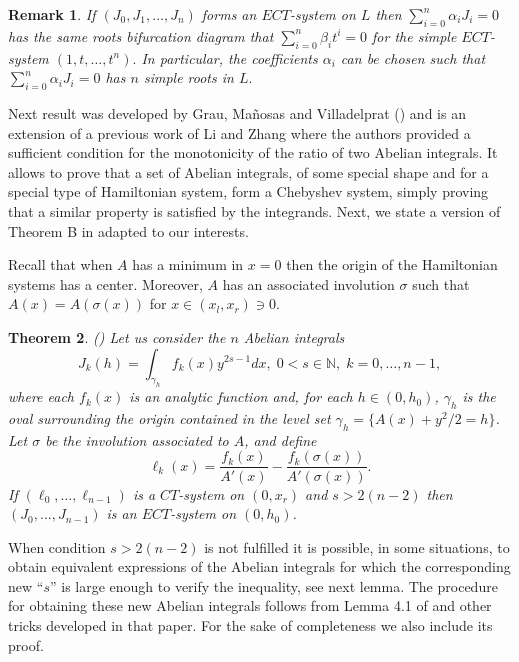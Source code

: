 \documentclass[12pt,a4paper,reqno]{amsart}
\newcommand{\N}{\mathbb{N}}
\newtheorem{teo}{Theorem}[section]
\newtheorem{rem}[teo]{Remark}
\begin{document}
    \begin{rem}%
        If $(J_0, J_1,\ldots, J_n ) $ forms an $ECT$-system on $ L $ then $\sum_ {i = 0} ^ n \alpha_i J_i =0 $
        has the same roots bifurcation diagram that  $\sum_ {i = 0} ^ n \beta_i t ^ i =0$ for the simple  $ECT$-system
        $(1,t,\ldots,t^n).$
         In particular, the  coefficients $\alpha_i$ can be chosen  such that  $\sum_ {i = 0} ^ n \alpha_i J_i =0$ has $n$ simple roots in
         $L.$
    \end{rem}

Next result was developed by Grau, Ma\~{n}osas and Villadelprat
(\cite{GraManVil2011,ManVil2002})  and  is an extension of a
previous work of Li and Zhang \cite{LiZhang1996} where the authors
provided a sufficient condition for the monotonicity of the ratio of
two Abelian integrals. It allows to prove that a set of Abelian
integrals, of some special shape and  for a special type of
Hamiltonian system, form a Chebyshev system, simply proving that a
similar property is satisfied by the integrands. Next, we state a
version of Theorem B in \cite{GraManVil2011} adapted to our
interests.

Recall that when $ A $ has a minimum in $ x = 0 $ then the origin of
the Hamiltonian systems has a center. Moreover, $A$ has an
associated involution $\sigma$ such
  that $A(x)=A(\sigma(x))$ for $x\in(x_l,x_r)\ni0.$

\begin{teo}\label{criteriointabeliana}
    {\rm (\cite{GraManVil2011})}
        Let us consider the $n$ Abelian integrals
        \begin{equation*}
        J_k(h) = \displaystyle\int_{\gamma_h}  f_k(x) y^{2s-1}dx, \; 0<s \in \N,  \; k=0,\ldots,n-1,
        \end{equation*}
        where each $f_k(x)$ is an analytic function and, for each  $h \in (0,h_0)$, $\gamma_h$ is the oval
        surrounding the origin contained in the level set $\gamma_h=\{ A(x) +y^{2}/2 = h \}$. Let $\sigma$ be
         the involution associated to $A$, and define
        $$\ell_k(x) = \dfrac{f_k(x)}{A'(x)}-\dfrac{f_k(\sigma(x))}{A'(\sigma(x))}.$$
       If $(\ell_0,\ldots,\ell_{n-1})$ is a
        $CT$-system on $(0,x_r)$ and $s>2(n-2)$ then $(J_0,\ldots,J_{n-1})$ is an $ECT$-system on $(0,h_0)$.
    \end{teo}


 When condition $s>2(n-2)$ is not  fulfilled it is possible, in some situations,
 to obtain equivalent expressions of the Abelian integrals for which the corresponding  new ``$s$'' is large enough to
 verify the inequality, see next lemma.
 The procedure for obtaining these new Abelian integrals follows from Lemma 4.1 of \cite{GraManVil2011} and other tricks developed in that paper.
   For the sake of completeness we also include its proof.
\end{document}
